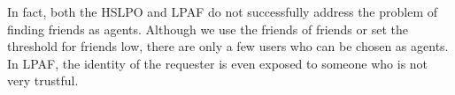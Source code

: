 In fact, both the HSLPO and LPAF do not successfully address the problem of finding friends as agents. Although we use the friends of friends or set the threshold for friends low, there are only a few users who can be chosen as agents. In LPAF, the identity of the requester is even exposed to someone who is not very trustful. 




















